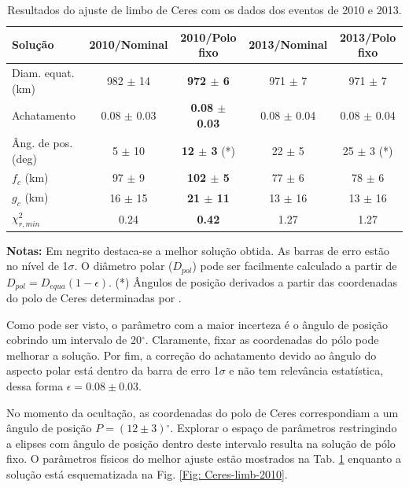 \documentclass[12pt,a4paper]{monografia}
\newcommand{\degr}{\ensuremath{^{\circ}}}%
\begin{document}
\begin{table}[h]
 \begin{centering}
  \caption{Resultados do ajuste de limbo de Ceres com os dados dos eventos de 2010 e 2013.\label{Tab: resultados}}
  \begin{tabular}{@{}lcccc}
  \hline
     Solução & 2010/Nominal & \textbf{2010/Polo fixo} & 2013/Nominal & 2013/Polo fixo \\
\hline
Diam. equat.  (km) & 982 $\pm$ 14 & \textbf{972 $\pm$ 6}  & 971 $\pm$ 7  & 971 $\pm$ 7\\
Achatamento        & 0.08 $\pm$ 0.03 & \textbf{0.08 $\pm$ 0.03} & 0.08 $\pm$ 0.04 & 0.08 $\pm$ 0.04\\
Âng. de pos. (deg)   & 5 $\pm$ 10    & \textbf{12 $\pm$ 3} (*)& 22 $\pm$ 5    & 25 $\pm$ 3 (*)\\
$f_c$ (km)             & 97 $\pm$ 9   & \textbf{102 $\pm$ 5}   & 77 $\pm$ 6    & 78 $\pm$ 6\\
$g_c$ (km)             & 16 $\pm$ 15  & \textbf{21 $\pm$ 11}  & 13 $\pm$ 16   & 13 $\pm$ 16\\
$\chi^2_{r,min}$       & 0.24          &  \textbf{0.42}         & 1.27          & 1.27\\
\hline
\end{tabular}
\textbf{Notas:} Em negrito destaca-se a melhor solução obtida. As barras de erro estão no nível de 1$\sigma$. O diâmetro polar ($D_{pol}$) pode ser facilmente calculado a partir de $D_{pol}=D_{equa}(1 - \epsilon)$. (*) Ângulos de posição derivados a partir das coordenadas do polo de Ceres determinadas por \cite{Drummond2014}.
\end{centering}
\end{table}

Como pode ser visto, o parâmetro com a maior incerteza é o ângulo de posição cobrindo um intervalo de 20$\degr$. Claramente, fixar as coordenadas do pólo pode melhorar a solução. Por fim, a correção do achatamento devido ao ângulo do aspecto polar está dentro da barra de erro 1$\sigma$ e não tem relevância estatística, dessa forma $\epsilon = 0.08 \pm 0.03$.

No momento da ocultação, as coordenadas do polo de Ceres correspondiam a um ângulo de posição $P = (12 \pm 3)\degr$. Explorar o espaço de parâmetros restringindo a elipses com ângulo de posição dentro deste intervalo resulta na solução de pólo fixo. O parâmetros físicos do melhor ajuste estão mostrados na Tab. \ref{Tab: resultados} enquanto a solução está esquematizada na Fig. \ref{Fig: Ceres-limb-2010}.
\end{document}
